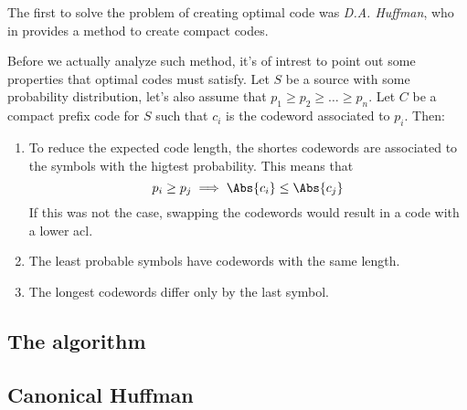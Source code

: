 \documentclass{subfiles}
\begin{document}
\label{Sec:2}
    The first to solve the problem of creating optimal code was \emph{D.A. Huffman},
       who in \cite{Huffman} provides a method to create compact codes.

        Before we actually analyze such method, 
            it's of intrest to point out some properties that optimal codes 
            must satisfy.
        Let \(S\) be a source with some probability distribution,
        let's also assume that \(p_{1} \ge p_{2} \ge \ldots \ge p_{n}\).
        Let \(C\) be a compact prefix code for \(S\) such that \(c_{i}\) is 
            the codeword associated to \(p_{i}\). Then:
        \begin{enumerate}
            \item To reduce the expected code length, 
                the shortes codewords are associated to the symbols with the higtest
                probability. This means that 
                \[
                   p_{i} \ge p_{j} \implies \Abs{c_{i}} \le \Abs{c_{j}}
                \]
                If this was not the case, 
                swapping the codewords would result in a code with a lower \gls{acl}.

            \item The least probable symbols have codewords with the same length.
            \item The longest codewords differ only by the last symbol.
        \end{enumerate}

        \subsection{The algorithm}
        

        \subsection{Canonical Huffman}
        
\end{document}
